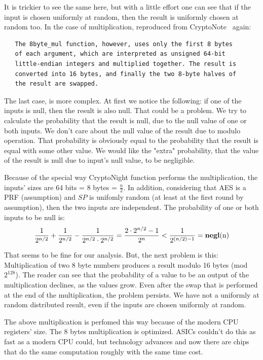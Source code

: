 It is trickier to see the same here, but with a little effort one can see that if the input is chosen uniformly at random, then the result is uniformly chosen at random too. In the case of multiplication, reproduced from CryptoNote~\cite{cryptonight} again:
\begin{verbatim}
   The 8byte_mul function, however, uses only the first 8 bytes
   of each argument, which are interpreted as unsigned 64-bit
   little-endian integers and multiplied together. The result is
   converted into 16 bytes, and finally the two 8-byte halves of
   the result are swapped.
\end{verbatim}

The last case, is more complex. At first we notice the following: if one of the inputs is null, then the result is also null. That could be a problem. We try to calculate the probability that the result is null, due to the null value of one or both inputs. We don't care about the null value of the result due to modulo operation. That probability is obviously equal to the probability that the result is equal with some other value. We would like the "extra" probability, that the value of the result is null due to input's null value, to be negligible.

Because of the special way CryptoNight function performs the multiplication, the inputs' sizes are 64 bits = 8 bytes = $\frac{n}{2}$. In addition, considering that AES is a PRF (assumption) and $SP$ is unifomly random (at least at the first round by assumption), then the two inputs are independent. The probability of one or both inputs to be null is:
\begin{equation} \label{prob_zero}
  \frac{1}{2^{n/2}} + \frac{1}{2^{n/2}} - \frac{1}{2^{n/2} \cdot 2^{n/2}} = \frac{2\cdot2^{n/2}-1}{2^n} < \frac{1}{2^{(n/2)-1}} = \mbox{\textbf{negl}(n)}
\end{equation}
\vspace{0.3cm}

That seems to be fine for our analysis. But, the next problem is this: Multiplication of two 8 byte numbers produces a result modulo 16 bytes (mod $2^{128}$). The reader can see that the probability of a value to be an output of the multiplication declines, as the values grow. Even after the swap that is performed at the end of the multiplication, the problem persists. We have not a uniformly at random distributed result, even if the inputs are chosen uniformly at random.

The above multiplication is perfomed this way because of the modern CPU registers' size. The 8 bytes multiplication is optimized. ASICs couldn't do this as fast as a modern CPU could, but technology advances and now there are chips that do the same computation roughly with the same time cost.

